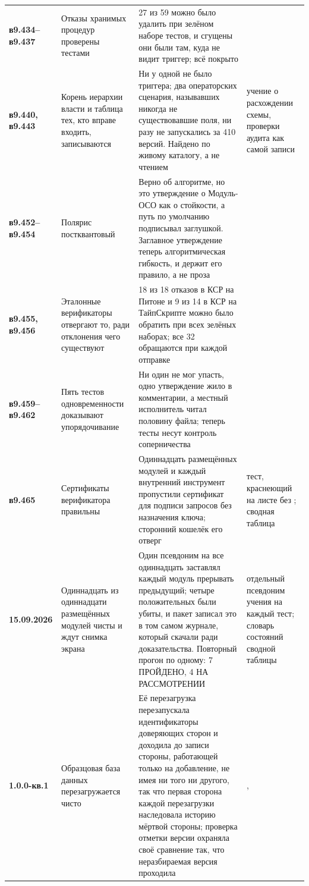 {\begin{xltabular}{\textwidth}{>{\bfseries\hspace{0pt}}p{0.74in} >{\RaggedRight\arraybackslash\hspace{0pt}}X >{\RaggedRight\arraybackslash\hspace{0pt}}X >{\RaggedRight\arraybackslash\hspace{0pt}}p{1.6in}}
в9.434--в9.437 & Отказы хранимых процедур проверены тестами & 27 из 59 можно было удалить при зелёном наборе тестов, и сгущены они были там, куда не видит триггер; всё покрыто &  \\
в9.440, в9.443 & Корень иерархии власти и таблица тех, кто вправе входить, записываются & Ни у одной не было триггера; два операторских сценария, называвших никогда не существовавшие поля, ни разу не запускались за 410 версий. Найдено по живому каталогу, а не чтением & учение о расхождении схемы, проверки аудита как самой записи \\
в9.452--в9.454 & Полярис постквантовый & Верно об алгоритме, но это утверждение о Модуль-ОСО как о стойкости, а путь по умолчанию подписывал заглушкой. Заглавное утверждение теперь алгоритмическая гибкость, и держит его правило, а не проза &  \\
в9.455, в9.456 & Эталонные верификаторы отвергают то, ради отклонения чего существуют & 18 из 18 отказов в КСР на Питоне и 9 из 14 в КСР на ТайпСкрипте можно было обратить при всех зелёных наборах; все 32 обращаются при каждой отправке &  \\
в9.459--в9.462 & Пять тестов одновременности доказывают упорядочивание & Ни один не мог упасть, одно утверждение жило в комментарии, а местный исполнитель читал половину файла; теперь тесты несут контроль соперничества &  \\
в9.465 & Сертификаты верификатора правильны & Одиннадцать размещённых модулей и каждый внутренний инструмент пропустили сертификат для подписи запросов без назначения ключа; сторонний кошелёк его отверг & тест, краснеющий на листе без ; сводная таблица \\
15.09.2026 & Одиннадцать из одиннадцати размещённых модулей чисты и ждут снимка экрана & Один псевдоним на все одиннадцать заставлял каждый модуль прерывать предыдущий; четыре положительных были убиты, и пакет записал это в том самом журнале, который скачали ради доказательства. Повторный прогон по одному: 7 ПРОЙДЕНО, 4 НА РАССМОТРЕНИИ & отдельный псевдоним учения на каждый тест; словарь состояний сводной таблицы \\
1.0.0-кв.1 & Образцовая база данных перезагружается чисто & Её перезагрузка перезапускала идентификаторы доверяющих сторон и доходила до записи стороны, работающей только на добавление, не имея ни того ни другого, так что первая сторона каждой перезагрузки наследовала историю мёртвой стороны; проверка отметки версии охраняла своё сравнение так, что неразбираемая версия проходила & ,  \\

\end{xltabular}}
